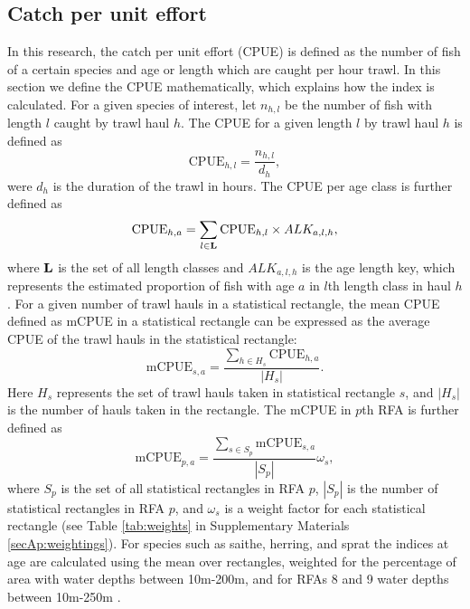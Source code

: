 \documentclass[a4paper 12pt]{article}
\numberwithin{equation}{section}
\begin{document}
\subsection{Catch per unit effort}
\label{sec:cpueestimators}
In this research, the catch per unit effort (CPUE) is defined as the number of fish of a certain species and age or length which are caught per hour trawl. In this section we define the CPUE mathematically, which explains how the index is calculated. For a given species of interest, let $n_{h,l}$ be the number of fish with length $l$ caught by trawl haul $h$. The CPUE for a given length $l$ by trawl haul $h$ is defined as 
\begin{equation}\label{eq:cpueHaul}
\mathrm{CPUE}_{h,l} =\frac{n_{h,l}}{d_h},
\end{equation}
were $d_h$ is the duration of the trawl in hours. The CPUE per age class is further defined as
\begin{equation}\label{eq:cpueALK}
\mathrm{CPUE}_{h,a} =\sum_{l \in {\bf L}}\mathrm{CPUE}_{h, l} \times ALK_{a,l,h},
\end{equation}
where ${\bf L}$ is the set of all length classes and $ALK_{a,l,h}$ is the age length key, which represents the estimated proportion of fish with age $a$ in $l$th length class in haul $h$. For a given number of trawl hauls in a statistical rectangle, the mean CPUE defined as  mCPUE  in a statistical rectangle can be expressed as the average CPUE of the trawl hauls in the statistical rectangle:
\begin{equation}\label{eq:cpueRec}
\mathrm{mCPUE}_{s,a} =\frac{\sum_{h \in H_{s}} \mathrm{CPUE}_{h,a}}{|H_{s}|}.
\end{equation}
Here $H_{s}$ represents the set of trawl hauls taken in statistical rectangle $s$, and $|H_{s}|$ is the number of hauls taken in the rectangle. The mCPUE in $p$th RFA is further defined as
\begin{equation}\label{eq:cpueRFA}
\mathrm{mCPUE}_{p,a} = \frac{ \sum_{s \in S_{p}} \mathrm{mCPUE}_{s,a}}{|S_{p}|} \omega_s,
\end{equation}
where $S_{p}$ is the set of all statistical rectangles in RFA $p$, $|S_{p}|$ is the number of statistical rectangles in RFA $p$, and $\omega_s$ is a weight factor for each statistical rectangle (see Table \ref{tab:weights} in Supplementary Materials \ref{secAp:weightings}). For species such as saithe, herring, and sprat the indices at age are calculated using the mean over rectangles, weighted for the percentage of area with water depths between 10m-200m, and for RFAs 8 and 9 water depths between 10m-250m \citep{ICES2013}.
\end{document}
